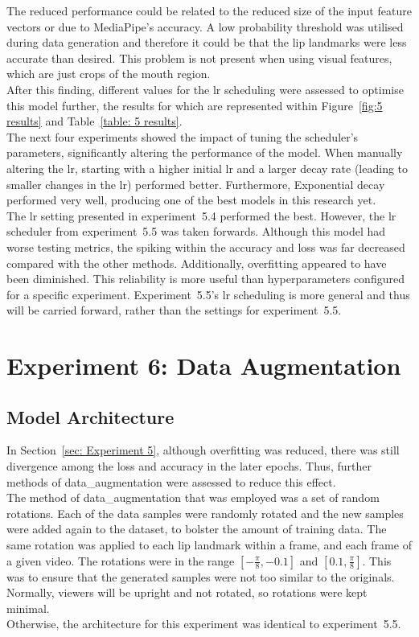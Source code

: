 The reduced performance could be related to the reduced size of the input feature vectors or due to MediaPipe's accuracy. A low probability threshold was utilised during data generation and therefore it could be that the lip landmarks were less accurate than desired. This problem is not present when using visual features, which are just crops of the mouth region.\\
After this finding, different values for the \acrshort{lr} scheduling were assessed to optimise this model further, the results for which are represented within Figure~\ref{fig:5 results} and Table~\ref{table: 5 results}.\\
The next four experiments showed the impact of tuning the scheduler's parameters, significantly altering the performance of the model. When manually altering the \acrshort{lr}, starting with a higher initial \acrshort{lr} and a larger decay rate (leading to smaller changes in the \acrshort{lr}) performed better. Furthermore, Exponential decay performed very well, producing one of the best models in this research yet.\\
The \acrshort{lr} setting presented in experiment~5.4 performed the best. However, the \acrshort{lr} scheduler from experiment~5.5 was taken forwards. Although this model had worse testing metrics, the spiking within the accuracy and loss was far decreased compared with the other methods. Additionally, \gls{overfitting} appeared to have been diminished. This reliability is more useful than hyperparameters configured for a specific experiment. Experiment~5.5's \acrshort{lr} scheduling is more general and thus will be carried forward, rather than the settings for experiment~5.5.
\section{Experiment 6: Data Augmentation}
\label{sec: Experiment 6}
\subsection{Model Architecture}
In Section~\ref{sec: Experiment 5}, although \gls{overfitting} was reduced, there was still divergence among the loss and accuracy in the later epochs. Thus, further methods of \gls{data_augmentation} were assessed to reduce this effect.\\
The method of \gls{data_augmentation} that was employed was a set of random rotations. Each of the data samples were randomly rotated and the new samples were added again to the dataset, to bolster the amount of training data. The same rotation was applied to each lip landmark within a frame, and each frame of a given video. The rotations were in the range $[-\frac{\pi}{8}, -0.1]$ and $[0.1, \frac{\pi}{8}]$. This was to ensure that the generated samples were not too similar to the originals. Normally, viewers will be upright and not rotated, so rotations were kept minimal.\\
Otherwise, the architecture for this experiment was identical to experiment~5.5.
